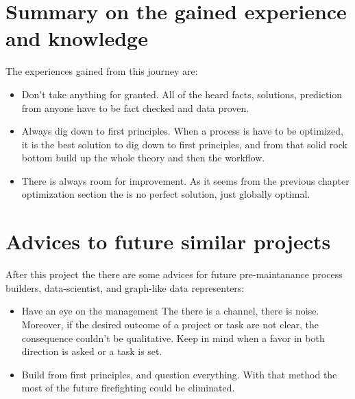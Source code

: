\section{Summary on the gained experience and knowledge}
The experiences gained from this journey are:
\begin{itemize}
	\item{Don't take anything for granted.} All of the heard facts, solutions, prediction from anyone have to be fact checked and data proven.
	\item{Always dig down to first principles.} When a process is have to be optimized, it is the best solution to dig down to first principles, and from that solid rock bottom build up the whole theory and then the workflow.
	\item{There is always room for improvement.} As it seems from the previous chapter optimization section the is no perfect solution, just globally optimal. 
\end{itemize}
\section{Advices to future similar projects}
After this project the there are some advices for future pre-maintanance process builders, data-scientist, and graph-like data representers:
\begin{itemize}
	\item{Have an eye on the management} The there is a channel, there is noise. Moreover, if the desired outcome of a project or task are not clear, the consequence couldn't be qualitative. Keep in mind when a favor in both direction is asked or a task is set.
	\item{Build from first principles, and question everything.} With that method the most of the future firefighting could be eliminated.
\end{itemize}